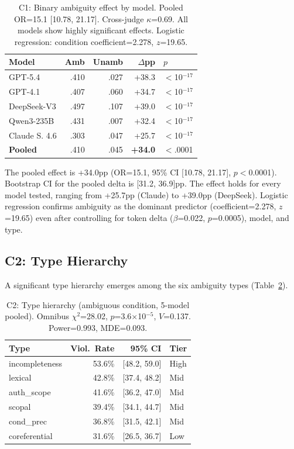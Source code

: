 \documentclass[11pt]{article}
\begin{document}
\begin{table}[t]
\centering
\small
\begin{tabular}{lrrrl}
\toprule
\textbf{Model} & \textbf{Amb} & \textbf{Unamb} & \textbf{$\Delta$pp} & \textbf{$p$} \\
\midrule
GPT-5.4 & .410 & .027 & +38.3 & $<$10$^{-17}$ \\
GPT-4.1 & .407 & .060 & +34.7 & $<$10$^{-17}$ \\
DeepSeek-V3 & .497 & .107 & +39.0 & $<$10$^{-17}$ \\
Qwen3-235B & .431 & .007 & +32.4 & $<$10$^{-17}$ \\
Claude S. 4.6 & .303 & .047 & +25.7 & $<$10$^{-17}$ \\
\midrule
\textbf{Pooled} & .410 & .045 & \textbf{+34.0} & $<$.0001 \\
\bottomrule
\end{tabular}
\caption{C1: Binary ambiguity effect by model. Pooled OR=15.1 [10.78, 21.17]. Cross-judge $\kappa$=0.69. All models show highly significant effects. Logistic regression: condition coefficient=2.278, $z$=19.65.}
\label{tab:c1}
\end{table}

The pooled effect is +34.0pp (OR=15.1, 95\% CI [10.78, 21.17], $p<$0.0001).
Bootstrap CI for the pooled delta is [31.2, 36.9]pp.
The effect holds for every model tested, ranging from +25.7pp (Claude) to +39.0pp (DeepSeek).
Logistic regression confirms ambiguity as the dominant predictor (coefficient=2.278, $z$=19.65) even after controlling for token delta ($\beta$=0.022, $p$=0.0005), model, and type.

\subsection{C2: Type Hierarchy}
\label{sec:c2}

A significant type hierarchy emerges among the six ambiguity types (Table~\ref{tab:c2}).

\begin{table}[t]
\centering
\small
\begin{tabular}{lrrl}
\toprule
\textbf{Type} & \textbf{Viol.\ Rate} & \textbf{95\% CI} & \textbf{Tier} \\
\midrule
incompleteness & 53.6\% & [48.2, 59.0] & High \\
lexical & 42.8\% & [37.4, 48.2] & Mid \\
auth\_scope & 41.6\% & [36.2, 47.0] & Mid \\
scopal & 39.4\% & [34.1, 44.7] & Mid \\
cond\_prec & 36.8\% & [31.5, 42.1] & Mid \\
coreferential & 31.6\% & [26.5, 36.7] & Low \\
\bottomrule
\end{tabular}
\caption{C2: Type hierarchy (ambiguous condition, 5-model pooled). Omnibus $\chi^2$=28.02, $p$=3.6$\times$10$^{-5}$, $V$=0.137. Power=0.993, MDE=0.093.}
\label{tab:c2}
\end{table}
\end{document}
